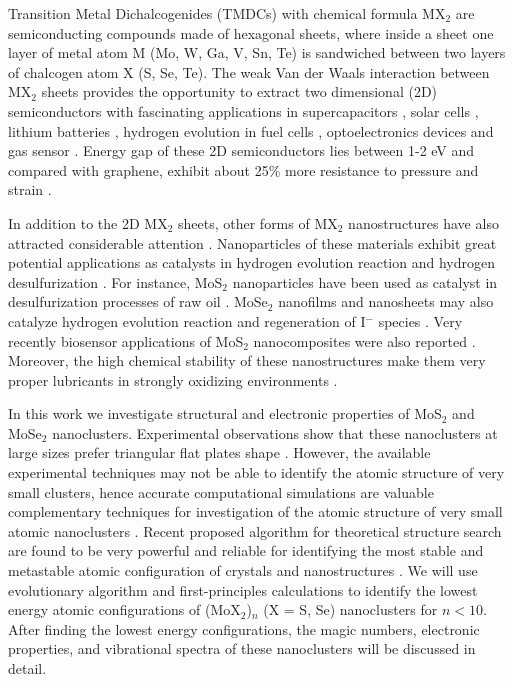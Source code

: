 \documentclass[nofootinbib,10pt,aip,twocolumn,showpacs]{revtex4-1}
\begin{document}
Transition Metal Dichalcogenides (TMDCs) with chemical formula MX$_2$
are semiconducting compounds made of hexagonal sheets, 
where inside a sheet one layer of metal atom M (Mo, W, Ga, V, Sn, Te) 
is sandwiched between two layers of chalcogen atom X (S, Se, Te).
The weak Van der Waals interaction between MX$_2$ sheets provides the opportunity 
to extract two dimensional (2D) semiconductors with fascinating applications in
supercapacitors \cite{muller2015high,huang2013},
solar cells \cite{ellmer2008,patel2011,tsai2014m,gawale2010,tributsch1978},
lithium batteries \cite{david2014,rouxel1986low,bhandavat2012,xiao2010},
hydrogen evolution in fuel cells \cite{kong2013first,chen2013},
optoelectronics devices
\cite{mak2010, ross2014, lopez2013, wang2012,tian2014novel}
and gas sensor
\cite{wang2012,late2014single}.
Energy gap of these 2D semiconductors lies between 1-2 eV and
compared with graphene, exhibit about 25\% more resistance
to pressure and strain \cite{he2013}.

In addition to the 2D MX$_2$ sheets, other forms of MX$_2$ nanostructures
have also attracted considerable attention \cite{parsapour1996electron,chikan2000relaxation}.
Nanoparticles of these materials exhibit great potential applications
as catalysts in hydrogen evolution reaction and hydrogen desulfurization
\cite{lauritsen2003c,hinnemann2005,mcbride2009,lauritsen2004a,liu20163d,tang2014}.
For instance, MoS$_2$ nanoparticles have been used as catalyst in desulfurization 
processes of raw oil \cite{zhu2013,chianelli2006}.
MoSe$_2$ nanofilms and nanosheets may also catalyze hydrogen evolution reaction 
and regeneration of I$^{-}$ species \cite{lee2014}.
Very recently biosensor applications of MoS$_2$ nanocomposites 
were also reported \cite{zhang2015}.
Moreover, the high chemical stability of these nanostructures
make them very proper lubricants in strongly oxidizing environments
\cite{cizaire2002,gemming2006}.

In this work we investigate structural and electronic properties of 
MoS$_2$ and MoSe$_2$ nanoclusters.
Experimental observations show that these nanoclusters at large sizes 
prefer triangular flat plates shape
\cite{lauritsen2007s,li2007,helveg2000atomic,bertram2006}.
However, the available experimental techniques may not be able 
to identify the atomic structure of very small clusters,
hence accurate computational simulations are valuable
complementary techniques for investigation of the atomic structure 
of very small atomic nanoclusters
\cite{seifert2000,cizaire2002,murugan2007u,murugan2005a}.
Recent proposed algorithm for theoretical structure search are found to be
very powerful and reliable for identifying the most stable and metastable
atomic configuration of crystals and nanostructures
\cite{chuang2006,oganov2008e}.
We will use evolutionary algorithm and first-principles calculations 
to identify the lowest energy atomic configurations
of (MoX$_2$)$_n$ (X = S, Se) nanoclusters for $n<10$.
After finding the lowest energy configurations,
the magic numbers, electronic properties, and vibrational spectra 
of these nanoclusters will be discussed in detail.
\end{document}
